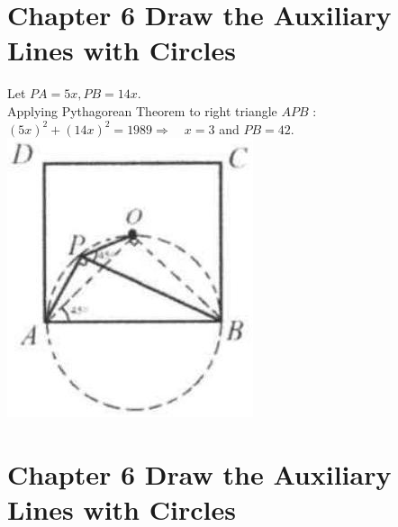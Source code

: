 \documentclass[10pt]{article}
\begin{document}
\section*{Chapter 6 Draw the Auxiliary Lines with Circles}
Let \(P A=5 x, P B=14 x\).\\
Applying Pythagorean Theorem to right triangle \(A P B\) :\\
\((5 x)^{2}+(14 x)^{2}=1989 \Rightarrow \quad x=3\) and \(P B=42\).\\
\includegraphics[max width=\textwidth, center]{2025_04_17_97bc1f7e44d93c271a88g-205}

\section*{Chapter 6 Draw the Auxiliary Lines with Circles}
\end{document}
